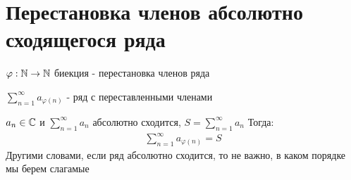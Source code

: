 \section{Перестановка членов абсолютно сходящегося ряда}
\newcommand{\sumn}{\sum \limits_{n=1}^\infty}
\newcommand{\sumk}{\sum \limits_{k=1}^n}
\newcommand{\prodn}{\prod \limits_{n=1}^\infty}
\newcommand{\prodk}{\prod \limits_{k=1}^n}

\begin{conj}

    $\varphi: \mathbb{N} \to \mathbb{N}$ биекция - перестановка членов ряда

    $\sum \limits_{n=1}^\infty a_{\varphi(n)}$
     - ряд с переставленными членами
\end{conj}

\begin{theorem}
    $a_n \in \mathbb{C}$ и $\sumn a_n$ абсолютно сходится, $S = \sumn a_n$
    Тогда:
    \begin{gather*}
        \sumn a_{\varphi(n)} = S
    \end{gather*}
    Другими словами, если ряд абсолютно сходится, то не важно, в каком порядке мы берем слагамые
\end{theorem}

